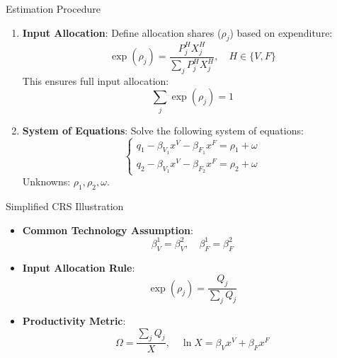 \documentclass[aspectratio=169]{beamer}  %
\begin{document}
\begin{frame}{Estimation Procedure}
\begin{enumerate}
    \item \textbf{Input Allocation}:
    Define allocation shares (\(\rho_j\)) based on expenditure:
    \[
    \exp(\rho_j) = \frac{P_{j}^{H} X_j^H}{\sum_j P_{j}^{H} X_j^H}, \quad H \in \{V, F\}
    \]
    This ensures full input allocation:
    \[
    \sum_j \exp(\rho_j) = 1
    \]

    \item \textbf{System of Equations}:
    Solve the following system of equations:
    \[
    \begin{cases}
    q_1 - \beta_{V_1} x^V - \beta_{F_1} x^F = \rho_1 + \omega \\
    q_2 - \beta_{V_1} x^V - \beta_{F_2} x^F = \rho_2 + \omega
    \end{cases}
    \]
    Unknowns: \(\rho_1, \rho_2, \omega\).

\end{enumerate}
\end{frame}


\begin{frame}{Simplified CRS Illustration}
\begin{itemize}
    \item \textbf{Common Technology Assumption}:
    \[
    \beta_V^1 = \beta_V^2,\quad \beta_F^1 = \beta_F^2
    \]
    
    \item \textbf{Input Allocation Rule}:
    \[
    \exp(\rho_j) = \frac{Q_j}{\sum_j Q_j}
    \]
    
    \item \textbf{Productivity Metric}:
    \[
    \Omega = \frac{\sum_j Q_j}{X},\quad \ln X = \beta_V x^V + \beta_F x^F
    \]
\end{itemize}
\end{frame}
\end{document}
